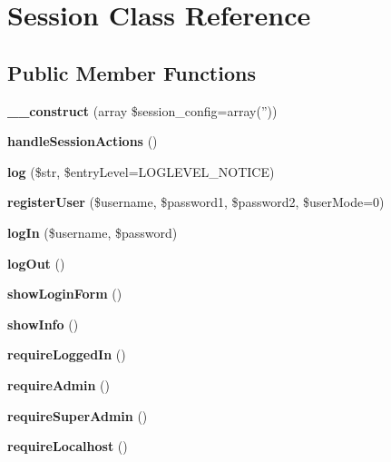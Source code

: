 \section{Session Class Reference}
\label{classSession}
\subsection*{Public Member Functions}
\begin{CompactItemize}
\item 
{\bf \_\-\_\-construct} (array \$session\_\-config=array(''))\label{classSession_164b575c907c91e3376d974f2c871969}

\item 
{\bf handleSessionActions} ()\label{classSession_cf56c71fdabc885e34cc9a1893833974}

\item 
{\bf log} (\$str, \$entryLevel=LOGLEVEL\_\-NOTICE)\label{classSession_c8c19626489e562fa21b05ee41a19cdd}

\item 
{\bf registerUser} (\$username, \$password1, \$password2, \$userMode=0)\label{classSession_fd458050ee38f3693413c20b8c8823ec}

\item 
{\bf logIn} (\$username, \$password)\label{classSession_afbc05247e68336711e7a878d09fd12b}

\item 
{\bf logOut} ()\label{classSession_ed7d987101f88110dbe68d52673b35cb}

\item 
{\bf showLoginForm} ()\label{classSession_2c0155a9615954690938980dd498478c}

\item 
{\bf showInfo} ()\label{classSession_0236b4ff1a99ea3c0135368eb2aed7a1}

\item 
{\bf requireLoggedIn} ()\label{classSession_dff1103f98663598054da09ace3169f6}

\item 
{\bf requireAdmin} ()\label{classSession_672e5ff8edb5b17f46bc0b4d4f947fb0}

\item 
{\bf requireSuperAdmin} ()\label{classSession_0029ae0be343a4887f7369cd5425ee4b}

\item 
{\bf requireLocalhost} ()\label{classSession_df1b91928eab8e828656019e339e2373}

\end{CompactItemize}

